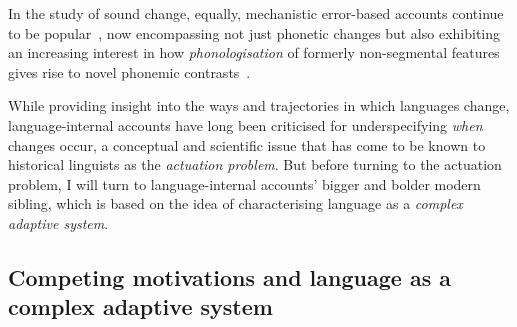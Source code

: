 In the study of sound change, equally, mechanistic error-based accounts continue to be popular~\citep[see e.g.][who make specific reference to the importance of \emph{asymmetries} between phonetic variants to explain change]{Garrett2013}, %
now encompassing not just phonetic changes but also exhibiting an increasing interest in how \emph{phonologisation} of formerly non-segmental features gives rise to novel phonemic contrasts~\citep[e.g.][]{Kirby2013}.

While providing insight into the ways and trajectories in which languages change, language-internal accounts have long been criticised for underspecifying \emph{when} changes occur, a conceptual and scientific issue that has come to be known to historical linguists as the \emph{actuation problem}. But before turning to the actuation problem, I will turn to language-internal accounts' bigger and bolder modern sibling, which is based on the idea of characterising language as a \emph{complex adaptive system}.



\subsection{Competing motivations and language as a complex adaptive system}
\label{sec:lcas}

